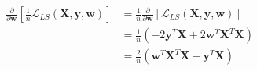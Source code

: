 \newcommand{\matrix}[1]{\mathbf{#1}}
\newcommand{\vector}[1]{\mathbf{#1}}
\newcommand{\X}{\matrix{X}}
\newcommand{\y}{\vector{y}}
\newcommand{\w}{\vector{w}}
\begin{align*}
\frac{\partial}{\partial \w} \left[ \frac{1}{n} \mathcal{L}_{LS}(\X,\y,\w) \right] &= \frac{1}{n} \frac{\partial}{\partial \w} \left[ \mathcal{L}_{LS}(\X,\y,\w) \right] \\
&= \frac{1}{n} \left( -2\y^T\X + 2\w^T\X^T\X \right) \\
&= \frac{2}{n} \left( \w^T\X^T\X - \y^T\X \right)
\end{align*}
